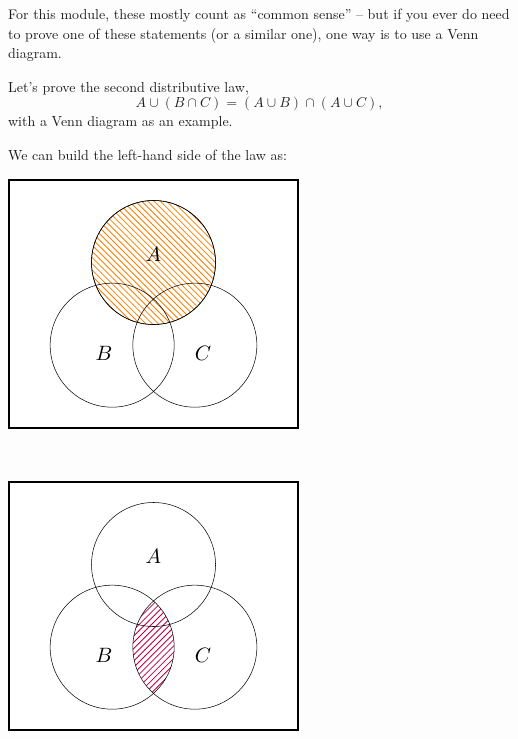 \documentclass[
  a4paper,
]{book}
\theoremstyle{definition}
\theoremstyle{definition}
\theoremstyle{definition}
\theoremstyle{definition}
\theoremstyle{remark}
\begin{document}
For this module, these mostly count as ``common sense'' -- but if you ever do need to prove one of these statements (or a similar one), one way is to use a Venn diagram.

Let's prove the second distributive law,
\[   A \cup (B \cap C) = (A \cup B) \cap (A \cup C) , \]
with a Venn diagram as an example.

We can build the left-hand side of the law as:

\begin{center}\includegraphics[width=1\linewidth]{math1710_files/figure-latex/dist1-1} \end{center}

~

\begin{center}\includegraphics[width=1\linewidth]{math1710_files/figure-latex/dist2-1} \end{center}
\end{document}
